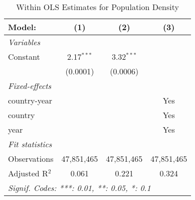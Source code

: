 
\begin{table}[htbp]
   \caption{Within OLS Estimates for Population Density}
   \centering
   \small
   \begin{tabular}{lccc}
      \tabularnewline \midrule \midrule
      Model:         & (1)          & (2)          & (3)\\  
      \midrule
      \emph{Variables}\\
      Constant       & 2.17$^{***}$ & 3.32$^{***}$ &   \\   
                     & (0.0001)     & (0.0006)     &   \\   
      \midrule
      \emph{Fixed-effects}\\
      country-year   &              &              & Yes\\  
      country        &              &              & Yes\\  
      year           &              &              & Yes\\  
      \midrule
      \emph{Fit statistics}\\
      Observations   & 47,851,465   & 47,851,465   & 47,851,465\\  
      Adjusted R$^2$ & 0.061        & 0.221        & 0.324\\  
      \midrule \midrule
      \multicolumn{4}{l}{\emph{Signif. Codes: ***: 0.01, **: 0.05, *: 0.1}}\\
   \end{tabular}
\end{table}


